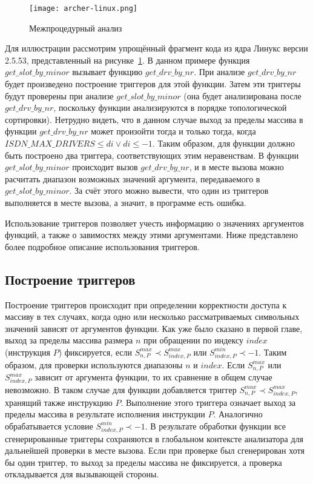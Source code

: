 \begin{figure}
    \texttt{[image: archer-linux.png]}
    \caption{Межпроцедурный анализ}
    \label{fig:archer-linux}
\end{figure}

Для иллюстрации рассмотрим упрощённый фрагмент кода из ядра Линукс
версии 2.5.53, представленный на рисунке~\ref{fig:archer-linux}. В
данном примере функция $get\_slot\_by\_minor$ вызывает функцию
$get\_drv\_by\_nr$. При анализе $get\_drv\_by\_nr$ будет произведено
построение триггеров для этой функции. Затем эти триггеры будут
проверены при анализе $get\_slot\_by\_minor$ (она будет анализирована
после $get\_drv\_by\_nr$, поскольку функции анализируются в порядке
топологической сортировки). Нетрудно видеть, что в данном случае выход
за пределы массива в функции $get\_drv\_by\_nr$ может произойти тогда
и только тогда, когда $ISDN\_MAX\_DRIVERS \leq di \vee di \leq
-1$. Таким образом, для функции должно быть построено два триггера,
соответствующих этим неравенствам. В функции $get\_slot\_by\_minor$
происходит вызов $get\_drv\_by\_nr$, и в месте вызова можно расчитать
диапазон возможных значений аргумента, передаваемого в
$get\_slot\_by\_minor$. За счёт этого можно вывести, что один из
триггеров выполняется в месте вызова, а значит, в программе есть
ошибка.

Использование триггеров позволяет учесть информацию о значениях
аргументов функций, а также о завимостях между этими аргументами. Ниже
представлено более подробное описание использования триггеров.

\subsection{Построение триггеров}

Построение триггеров происходит при определении корректности доступа к
массиву в тех случаях, когда одно или несколько рассматриваемых
символьных значений зависят от аргументов функции. Как уже было
сказано в первой главе, выход за пределы массива размера $n$ при
обращении по индексу $index$ (инструкция $P$) фиксируется, если
$S_{n, P}^{max} \prec S_{index, P}^{max}$ или
$S_{index, P}^{min} \prec -1$. Таким образом, для проверки
используются диапазоны $n$ и $index$. Если $S_{n, P}^{max}$ или
$S_{index, P}^{max}$ зависит от аргумента функции, то их сравнение в
общем случае невозможно. В таком случае для функции добавляется
триггер $S_{n, P}^{max} \prec S_{index, P}^{max}$, хранящий также
инструкцию $P$. Выполнение этого триггера означает выход за пределы
массива в результате исполнения инструкции $P$. Аналогично
обрабатывается условие $S_{index, P}^{min} \prec -1$. В результате
обработки функции все сгенерированные триггеры сохраняются в
глобальном контексте анализатора для дальнейшей проверки в месте
вызова. Если при проверке был сгенерирован хотя бы один триггер, то
выход за пределы массива не фиксируется, а проверка откладывается для
вызывающей стороны.

